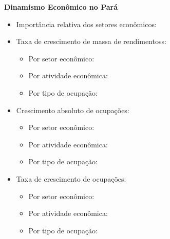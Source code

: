 \documentclass[8pt]{beamer}
\begin{document}
\begin{frame}[label=indice_principal_amz_pa]{}

\textit{\hyperlink{indice_principal}{}}

\textbf{Dinamismo Econômico no Pará}
\vspace{2mm}

\begin{itemize}

\item{Importância relativa dos setores econômicos: \hyperlink{_amz_pa_importancia_relativa}{}}
\vspace{1mm}

\item{Taxa de crescimento  de massa de rendimentoss:
	\begin{itemize}
	\item{Por setor econômico: \hyperlink{amzparkngtxmassaporsetor}{}}
	\item{Por atividade econômica: \hyperlink{amzparkngtxmassaporatividade}{}}
	\item{Por tipo de ocupação: \hyperlink{amzparkngtxmassaporocupacao}{}}
	\end{itemize}
}
\vspace{1mm}

\item{Crescimento  absoluto de ocupações:
	\begin{itemize}
	\item{Por setor econômico: \hyperlink{amzparkngnocuporsetor}{}}
	\item{Por atividade econômica: \hyperlink{amzparkngnocuporatividade}{}}
	\item{Por tipo de ocupação: \hyperlink{amzparkngnocuporocupacao}{}}
	\end{itemize}
}
\vspace{1mm}

\item{Taxa de crescimento de ocupações:
	\begin{itemize}
	\item{Por setor econômico: \hyperlink{amzparkngtxocuporsetor}{}}
	\item{Por atividade econômica: \hyperlink{amzparkngtxocuporatividade}{}}
	\item{Por tipo de ocupação: \hyperlink{amzparkngtxocuporocupacao}{}}
	\end{itemize}
}
\vspace{1mm}


\end{itemize}
\end{frame}
\end{document}

